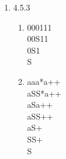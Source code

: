 \documentclass[letterpaper, 10pt]{article}
\begin{document}
\begin{enumerate}

    \item 4.5.3
    \begin{enumerate}
        \item 
        000111 \\
        00S11 \\
        0S1 \\
        S
        
        \item 
        aaa*a++ \\
        aSS*a++ \\
        aSa++ \\
        aSS++ \\
        aS+ \\
        SS+\\
        S
        
        
    \end{enumerate}
    
    
\end{enumerate}
\end{document}
